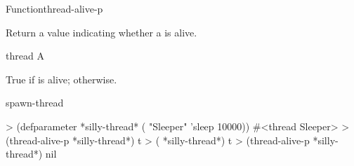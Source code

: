 \documentclass[10pt,twoside,english,pdftex]{article}
\begin{document}

\begin{functiondoc}{Function}{thread-alive-p}{ 
    \returns{} }

\fnsyntax

\fnpurpose Return a value indicating whether a  is alive.

\fnpackage {}

\fnmodule {}

\fnargs
\begin{args}{thread}
\arg[thread] A 
\end{args}

\fnreturns True if  is alive; \nil{} otherwise.

\fnerrors
\nothreads{}

\begin{alsos}{spawn-thread}
\end{alsos}

%
%
\fnexamples
\begin{example}
> (defparameter *silly-thread* ( "Sleeper" 'sleep 10000))
#<thread Sleeper>
> (thread-alive-p *silly-thread*)
t
> ( *silly-thread*)
t
> (thread-alive-p *silly-thread*)
nil
\end{example}

\end{functiondoc}

\end{document}
